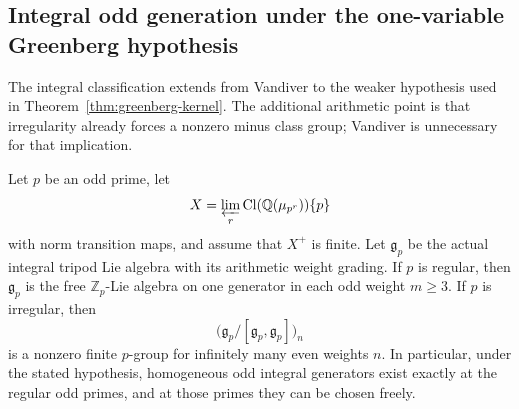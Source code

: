 \subsection{Integral odd generation under the one-variable Greenberg hypothesis}
\label{sec:greenberg-integral}

The integral classification extends from Vandiver to the weaker hypothesis
used in Theorem~\ref{thm:greenberg-kernel}.  The additional arithmetic
point is that irregularity already forces a nonzero minus class group;
Vandiver is unnecessary for that implication.

\begin{corollary}
\label{cor:greenberg-integral}
Let $p$ be an odd prime, let
\[
 X=\varprojlim_r\operatorname{Cl}(\mathbb Q(\mu_{p^r}))\{p\}
\]
with norm transition maps, and assume that $X^+$ is finite.
Let $\mathfrak g_p$ be the actual integral tripod Lie algebra with
its arithmetic weight grading.
If $p$ is regular, then $\mathfrak g_p$ is the free
$\mathbb Z_p$-Lie algebra on one generator in each odd weight
$m\ge3$.  If $p$ is irregular, then
\[
 \bigl(\mathfrak g_p/[\mathfrak g_p,\mathfrak g_p]\bigr)_n
\]
is a nonzero finite $p$-group for infinitely many even weights $n$.
In particular, under the stated hypothesis, homogeneous odd integral
generators exist exactly at the regular odd primes, and at those primes
they can be chosen freely.
\end{corollary}

